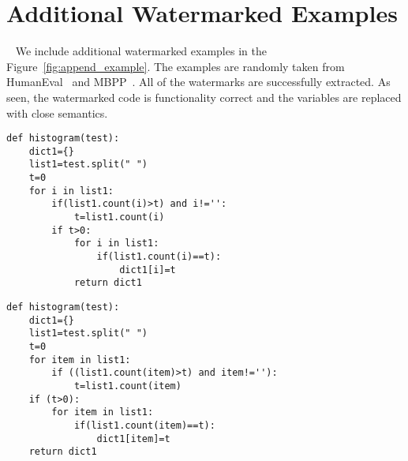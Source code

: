 \section{Additional Watermarked Examples}~\label{ap:example}
We include additional watermarked examples in the Figure~\ref{fig:append_example}.  The examples are randomly taken from HumanEval~\cite{chen2021codex} and MBPP~\cite{austin2021program}. All of the watermarks are successfully extracted. As seen, the watermarked code is functionality correct and the variables are replaced with close semantics. 


\begin{figure*}[!ht]
    \centering   
    \vspace{-10pt}
    \begin{minipage}{0.47\textwidth}
 \begin{lstlisting}[basicstyle=\ttfamily\tiny,numbers=none,caption=Original code \#1]
def histogram(test):
    dict1={} 
    list1=test.split(" ") 
    t=0 
    for i in list1: 
        if(list1.count(i)>t) and i!='': 
            t=list1.count(i) 
        if t>0: 
            for i in list1: 
                if(list1.count(i)==t): 
                    dict1[i]=t 
            return dict1
\end{lstlisting}
    \end{minipage}
    \hfill
    \begin{minipage}{0.47\textwidth}
        \begin{lstlisting}[basicstyle=\ttfamily\tiny,numbers=none,caption=Watermarked code \#1]
def histogram(test):
    dict1={}
    list1=test.split(" ")
    t=0
    for item in list1:
        if ((list1.count(item)>t) and item!=''):
            t=list1.count(item)
    if (t>0):
        for item in list1:
            if(list1.count(item)==t):
                dict1[item]=t
    return dict1
        \end{lstlisting}
    \end{minipage} \\\vspace{-10pt}


\end{figure*}
